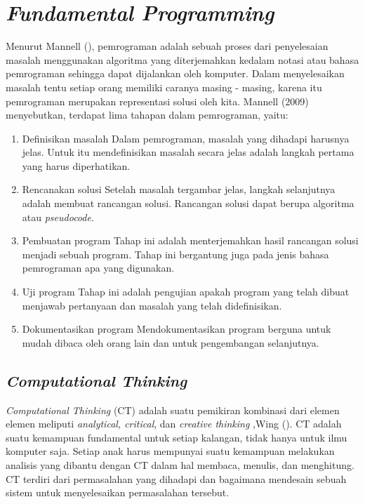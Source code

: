 \section{\textit{Fundamental Programming}}
	Menurut Mannell (\citeyear{paper.mannell}), pemrograman adalah sebuah proses dari penyelesaian masalah menggunakan algoritma yang diterjemahkan kedalam notasi atau bahasa pemrograman sehingga dapat dijalankan oleh komputer. Dalam menyelesaikan masalah tentu setiap orang memiliki caranya masing - masing, karena itu pemrograman merupakan representasi solusi oleh kita.
	\linebreak\linebreak
	Mannell (2009) menyebutkan, terdapat lima tahapan dalam pemrograman, yaitu:
	\begin{enumerate}
		\item Definisikan masalah
			\subitem Dalam pemrograman, masalah yang dihadapi harusnya jelas. Untuk itu mendefinisikan masalah secara jelas adalah langkah pertama yang harus diperhatikan.
		\item Rencanakan solusi
			\subitem Setelah masalah tergambar jelas, langkah selanjutnya adalah membuat rancangan solusi. Rancangan solusi dapat berupa algoritma atau \textit{pseudocode}.
		\item Pembuatan program
			\subitem Tahap ini adalah menterjemahkan hasil rancangan solusi menjadi sebuah program. Tahap ini bergantung juga pada jenis bahasa pemrograman apa yang digunakan.
		\item Uji program
			\subitem Tahap ini adalah pengujian apakah program yang telah dibuat menjawab pertanyaan dan masalah yang telah didefinisikan.
		\item Dokumentasikan program
			\subitem Mendokumentasikan program berguna untuk mudah dibaca oleh orang lain dan untuk pengembangan selanjutnya.
	\end{enumerate}
	\subsection{\textit{Computational Thinking}}
	\textit{Computational Thinking} (CT) adalah suatu pemikiran kombinasi dari elemen elemen meliputi \textit{analytical, critical}, dan \textit{creative thinking} ,Wing (\citeyear{paper.wing}).  CT adalah suatu kemampuan fundamental untuk setiap kalangan, tidak hanya untuk ilmu komputer saja. Setiap anak harus mempunyai suatu kemampuan melakukan analisis yang dibantu dengan CT dalam hal membaca, menulis, dan menghitung. CT terdiri dari permasalahan yang dihadapi dan bagaimana mendesain sebuah sistem untuk menyelesaikan permasalahan tersebut.
	
